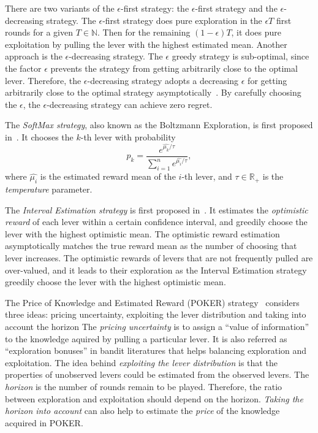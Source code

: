 There are two variants of the $\epsilon$-first strategy: the $\epsilon$-first strategy and the $\epsilon$-decreasing strategy.
The $\epsilon$-first strategy does pure exploration in the $\epsilon T$ first rounds for a given $T \in \mathbb{N}$.
Then for the remaining $(1 - \epsilon ) T$, it does pure exploitation by pulling the lever with the highest estimated mean.
Another approach is the $\epsilon$-decreasing strategy.
The $\epsilon$ greedy strategy is sub-optimal,
since the factor $\epsilon$ prevents the strategy from getting arbitrarily close to the optimal lever.
Therefore, the $\epsilon$-decreasing strategy adopts a decreasing $\epsilon$ 
for getting arbitrarily close to the optimal strategy asymptotically~\cite{Vermorel:2005:MAB}.
By carefully choosing the $\epsilon$, the $\epsilon$-decreasing strategy can achieve zero regret.

The \textit{SoftMax strategy}, also known as the Boltzmann Exploration, is first proposed in~\cite{Luce:1959:softmax}.
It chooses the $k$-th lever with probability
\begin{displaymath}
p_k = \frac{ e^{ \hat{ \mu_k } / \tau } }{ \sum_{i=1}^{n} e^{ \hat{ \mu_i } / \tau } },
\end{displaymath}
where $\hat{\mu_i}$ is the estimated reward mean of the $i$-th lever,
and $\tau \in \mathbb{R}_+$ is the \textit{temperature} parameter.


The \textit{Interval Estimation strategy} is first proposed in~\cite{Kaelbling:1993:interval_estimation}.
It estimates the \textit{optimistic reward} of each lever within a certain confidence interval,
and greedily choose the lever with the highest optimistic mean.
The optimistic reward estimation asymptotically matches the true reward mean as the number of choosing that lever increases.
The optimistic rewards of levers that are not frequently pulled are over-valued, 
and it leads to their exploration as the Interval Estimation strategy greedily choose the lever with the highest optimistic mean.

The Price of Knowledge and Estimated Reward (POKER) strategy~\cite{Vermorel:2005:MAB}
considers three ideas: pricing uncertainty, exploiting the lever distribution and taking into account the horizon
The \textit{pricing uncertainty} is to assign a ``value of information'' to the knowledge aquired by pulling a particular lever.
It is also referred as ``exploration bonuses'' in bandit literatures that helps balancing exploration and exploitation.
The idea behind \textit{exploiting the lever distribution} is that
the properties of unobserved levers could be estimated from the observed levers.
The \textit{horizon} is the number of rounds remain to be played.
Therefore, the ratio between exploration and exploitation should depend on the horizon.
\textit{Taking the horizon into account} can also help to estimate the \textit{price} of the knowledge acquired in POKER.

